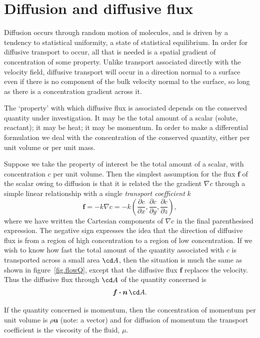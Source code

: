 \documentclass[twoside,11pt]		{report}
\begin{document}
\section{Diffusion and diffusive flux}

Diffusion occurs through random motion of molecules, and is driven by
a tendency to statistical uniformity, \ie a state of statistical
equilibrium. In order for diffusive transport to occur, all that is
needed is a spatial gradient of concentration of some property. Unlike
transport associated directly with the velocity field, diffusive
transport will occur in a direction normal to a surface even if there
is no component of the bulk velocity normal to the surface, so long as
there is a concentration gradient across it.

The `property' with which diffusive flux is associated depends on the
conserved quantity under investigation. It may be the total amount of
a scalar (\eg solute, reactant); it may be heat; it may be momentum.
In order to make a differential formulation we deal with the
concentration of the conserved quantity, either per unit volume or per
unit mass.

Suppose we take the property of interest be the total amount of a
scalar, with concentration $c$ per unit volume. Then the simplest
assumption for the flux $\bm{f}$ of the scalar owing to diffusion is
that it is related the the gradient $\nabla c$ through a simple linear
relationship with a single \emph{transport coefficient} $k$
\[
\bm{f}=-k\nabla c = -k \left(
 \frac{\partial c}{\partial x},
 \frac{\partial c}{\partial y},
 \frac{\partial c}{\partial z}
\right),
\]
where we have written the Cartesian components of $\nabla c$ in the
final parenthesised expression. The negative sign expresses the idea
that the direction of diffusive flux is from a region of high
concentration to a region of low concentration. If we wish to know how
fast the total amount of the quantity associated with $c$ is
transported across a small area $\cd A$, then the situation is much
the same as shown in figure~\ref{fig.flowQ}, except that the diffusive
flux $\bm{f}$ replaces the velocity. Thus the diffusive flux through
$\cd A$ of the quantity concerned is
\[
\bm{f\cdot n}\,\cd A.
\]

If the quantity concerned is momentum, then the concentration of
momentum per unit volume is $\rho\bm{u}$ (note: a vector) and for
diffusion of momentum the transport coefficient is the viscosity of the
fluid, $\mu$.
\end{document}

